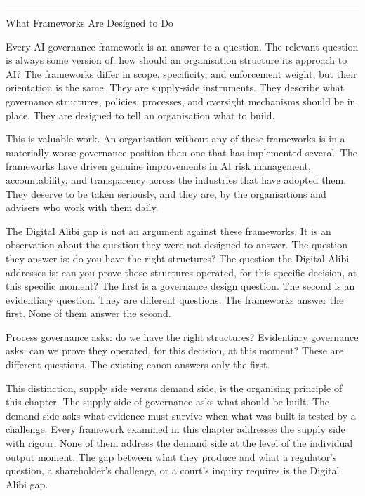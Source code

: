 \begin{center}\rule{0.5\linewidth}{0.5pt}\end{center}

What Frameworks Are Designed to Do

Every AI governance framework is an answer to a question. The relevant question is always some version of: how should an organisation structure its approach to AI? The frameworks differ in scope, specificity, and enforcement weight, but their orientation is the same. They are supply-side instruments. They describe what governance structures, policies, processes, and oversight mechanisms should be in place. They are designed to tell an organisation what to build.

This is valuable work. An organisation without any of these frameworks is in a materially worse governance position than one that has implemented several. The frameworks have driven genuine improvements in AI risk management, accountability, and transparency across the industries that have adopted them. They deserve to be taken seriously, and they are, by the organisations and advisers who work with them daily.

The Digital Alibi gap is not an argument against these frameworks. It is an observation about the question they were not designed to answer. The question they answer is: do you have the right structures? The question the Digital Alibi addresses is: can you prove those structures operated, for this specific decision, at this specific moment? The first is a governance design question. The second is an evidentiary question. They are different questions. The frameworks answer the first. None of them answer the second.

Process governance asks: do we have the right structures? Evidentiary governance asks: can we prove they operated, for this decision, at this moment? These are different questions. The existing canon answers only the first.

This distinction, supply side versus demand side, is the organising principle of this chapter. The supply side of governance asks what should be built. The demand side asks what evidence must survive when what was built is tested by a challenge. Every framework examined in this chapter addresses the supply side with rigour. None of them address the demand side at the level of the individual output moment. The gap between what they produce and what a regulator's question, a shareholder's challenge, or a court's inquiry requires is the Digital Alibi gap.

